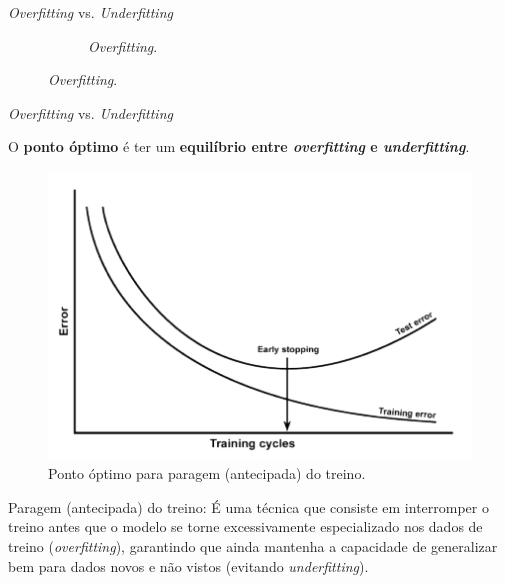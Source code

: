\begin{frame}{\textit{Overfitting} vs. \textit{Underfitting}}
\begin{figure}
\begin{subfigure}{0.3\textwidth}
			\caption{\textit{Overfitting}.}
		\end{subfigure}
	\end{figure}
    
    
\end{frame}

\begin{frame}{\textit{Overfitting} vs. \textit{Underfitting} \cont}
    
    O \textbf{ponto óptimo} é ter um \textbf{equilíbrio entre \textit{overfitting} e \textit{underfitting}}.
    
    \begin{figure}
        \centering
        \includegraphics[width=0.45\linewidth]{img/estop.png}
        \caption{Ponto óptimo para paragem (antecipada) do treino.}
    \end{figure}

    \pause

    \begin{exampleblock}{Paragem (antecipada) do treino:}
        É uma técnica que consiste em interromper o treino antes que o modelo se torne excessivamente especializado nos dados de treino (\textit{overfitting}), garantindo que ainda mantenha a capacidade de generalizar bem para dados novos e não vistos (evitando \textit{underfitting}).
    \end{exampleblock}
    
\end{frame}

